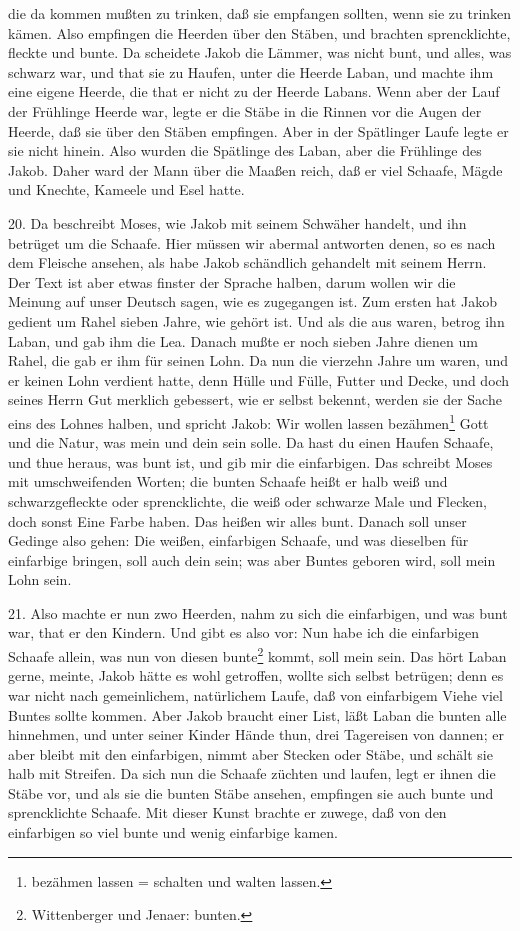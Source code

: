 \begin{schriftzitat}
die da kommen mußten zu trinken, daß sie empfangen sollten, wenn sie zu trinken kämen. Also empfingen die Heerden über den Stäben, und brachten sprencklichte, fleckte und bunte. Da scheidete Jakob die Lämmer, was nicht bunt, und alles, was schwarz war, und that sie zu Haufen, unter die Heerde Laban, und machte ihm eine eigene Heerde, die that er nicht zu der Heerde Labans. Wenn aber der Lauf der Frühlinge Heerde war, legte er die Stäbe in die Rinnen vor die Augen der Heerde, daß sie über den Stäben empfingen. Aber in der Spätlinger Laufe legte er sie nicht hinein. Also wurden die Spätlinge des Laban, aber die Frühlinge des Jakob. Daher ward der Mann über die Maaßen reich, daß er viel Schaafe, Mägde und Knechte, Kameele und Esel hatte.
\end{schriftzitat}

20. Da beschreibt Moses, wie Jakob mit seinem Schwäher handelt, und ihn betrüget um die Schaafe. Hier müssen wir abermal antworten denen, so es nach dem Fleische ansehen, als habe Jakob schändlich gehandelt mit seinem Herrn. Der Text ist aber etwas finster der Sprache halben, darum wollen wir die Meinung auf unser Deutsch sagen, wie es zugegangen ist. Zum ersten hat Jakob gedient um Rahel sieben Jahre, wie gehört ist. Und als die aus waren, betrog ihn Laban, und gab ihm die Lea. Danach mußte er noch sieben Jahre dienen um Rahel, die gab er ihm für seinen Lohn. Da nun die vierzehn Jahre um waren, und er keinen Lohn verdient hatte, denn Hülle und Fülle, Futter und Decke, und doch seines Herrn Gut merklich gebessert, wie er selbst bekennt, werden sie der Sache eins des Lohnes halben, und spricht Jakob: Wir wollen lassen bezähmen\footnote{bezähmen lassen = schalten und walten lassen.} Gott und die Natur, was mein und dein sein solle. Da hast du einen Haufen Schaafe, und thue heraus, was bunt ist, und gib mir die einfarbigen. Das schreibt Moses mit umschweifenden Worten; die bunten Schaafe heißt er halb weiß und schwarzgefleckte oder sprencklichte, die weiß oder schwarze Male und Flecken, doch sonst Eine Farbe haben. Das heißen wir alles bunt. Danach soll unser Gedinge also gehen: Die weißen, einfarbigen Schaafe, und was dieselben für einfarbige bringen, soll auch dein sein; was aber Buntes geboren wird, soll mein Lohn sein.

21. Also machte er nun zwo Heerden, nahm zu sich die einfarbigen, und was bunt war, that er den Kindern. Und gibt es also vor: Nun habe ich die einfarbigen Schaafe allein, was nun von diesen bunte\footnote{Wittenberger und Jenaer: bunten.} kommt, soll mein sein. Das hört Laban gerne, meinte, Jakob hätte es wohl getroffen, wollte sich selbst betrügen; denn es war nicht nach gemeinlichem, natürlichem Laufe, daß von einfarbigem Viehe viel Buntes sollte kommen. Aber Jakob braucht einer List, läßt Laban die bunten alle hinnehmen, und unter seiner Kinder Hände thun, drei Tagereisen von dannen; er aber bleibt mit den einfarbigen, nimmt aber Stecken oder Stäbe, und schält sie halb mit Streifen. Da sich nun die Schaafe züchten und laufen, legt er ihnen die Stäbe vor, und als sie die bunten Stäbe ansehen, empfingen sie auch bunte und sprencklichte Schaafe. Mit dieser Kunst brachte er zuwege, daß von den einfarbigen so viel bunte und wenig einfarbige kamen.

